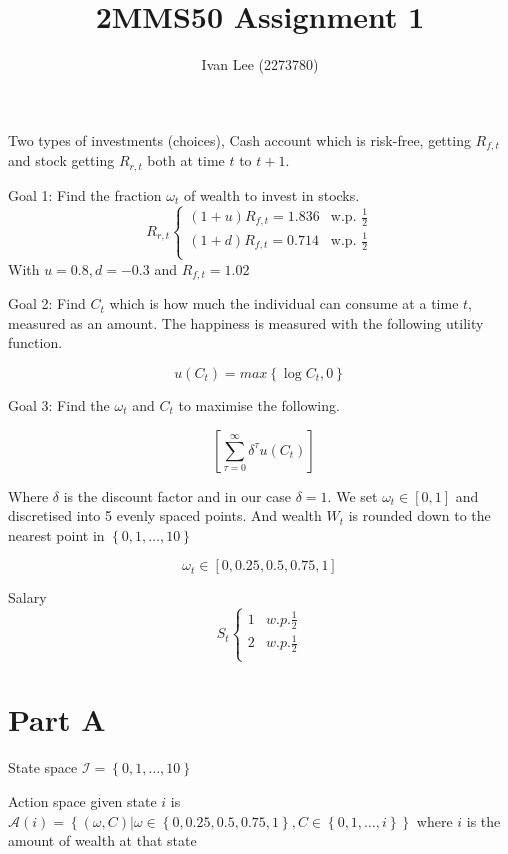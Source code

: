 \documentclass[12pt]{article}
\begin{document}
\title{2MMS50 Assignment 1}
\author{Ivan Lee (2273780)}
\maketitle

Two types of investments (choices), Cash account which is risk-free, getting
$R_{f,t}$ and stock getting $R_{r,t}$ both at time $t$ to $t+1$.

Goal 1: Find the fraction $\omega_t$ of wealth to invest in stocks. $$R_{r,t} \begin{cases}
		(1+u)R_{f,t}=1.836 & \text{w.p. } \frac{1}{2} \\
		(1+d)R_{f,t}=0.714 & \text{w.p. } \frac{1}{2} \\
	\end{cases}
$$
With $u = 0.8, d = -0.3$ and $R_{f,t}=1.02$

Goal 2: Find $C_t$ which is how much the individual can consume at a time $t$,
measured as an amount. The happiness is measured with the following utility
function.

$$
	u(C_t) = max\left\{ \log C_t, 0\right\}
$$

Goal 3: Find the $\omega_t$ and $C_t$ to maximise the following.

$$\mathop{\mathbb{E}_0}\left[\sum_{\tau=0}^{\infty}\delta^\tau u\left(C_t\right)\right]$$

Where $\delta$ is the discount factor and in our case $\delta=1$. We set
$\omega_t \in \left[0,1\right]$ and discretised into 5 evenly spaced points.
And wealth $W_t$ is rounded down to the nearest point in $\left\{0,1,\dots,
	10\right\}$

$$\omega_t \in \left[0,0.25,0.5,0.75,1\right]$$

Salary $$S_{t} \begin{cases}
		1 & w.p. \frac{1}{2} \\
		2 & w.p. \frac{1}{2} \\
	\end{cases}$$

\section{Part A}
State space $\mathcal{I} = \left\{0,1,\dots,10\right\}$

Action space given state $i$ is $\mathcal{A}(i) = \left\{(\omega, C) | \omega
	\in \left\{0,0.25,0.5,0.75,1\right\}, C \in \left\{0,1,\dots,i\right\}\right\}$
where $i$ is the amount of wealth at that state
\end{document}

